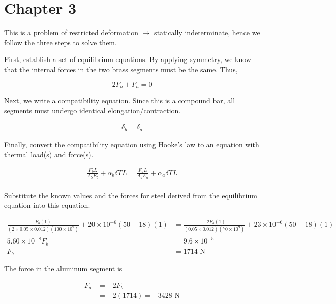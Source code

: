 \documentclass[
10pt,
a4paper,
openany,
svgnames,
]{book}
\begin{document}
\section{Chapter 3}

\begin{exercises}

\item This is a problem of restricted deformation $\rightarrow$ statically indeterminate, hence we follow the three steps to solve them.

  First, establish a set of equilibrium equations. By applying symmetry, we know that the internal forces in the two brass segments must be the same. Thus,

  \begin{equation*}
    2F_b + F_a = 0
  \end{equation*}

  Next, we write a compatibility equation. Since this is a compound bar, all segments must undergo identical elongation/contraction.

  \begin{align*}
    \delta_b = \delta_a
  \end{align*}

  Finally, convert the compatibility equation using Hooke's law to an equation with thermal load(s) and force(s).

  \begin{align*}
    \frac{F_bL}{A_bE_b} + \alpha_b \delta T L = \frac{F_aL}{A_aE_a} + \alpha_a \delta T L \\
  \end{align*}

  Substitute the known values and the forces for steel derived from the equilibrium equation into this equation.

  \begin{align*}
    \frac{F_b(1)}{(2 \times 0.05 \times 0.012) (100 \times 10^9)} + 20 \times 10^{-6} (50 - 18)(1) &= \frac{-2F_b(1)}{(0.05 \times 0.012) (70 \times 10^9)} + 23 \times 10^{-6} (50 - 18)(1) \\
    5.60 \times 10^{-8} F_b &= 9.6 \times 10^{-5} \\
    F_b &= 1714 \text{ N} 
  \end{align*}

  The force in the aluminum segment is
  
  \begin{align*}
    F_a &= -2F_b \\
        &= -2(1714) = -3428 \text{ N}
  \end{align*}


\end{exercises}
\end{document}
